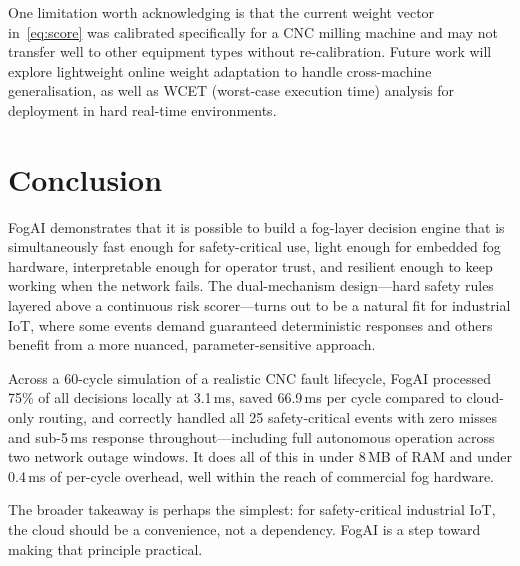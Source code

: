 \documentclass[conference]{IEEEtran}
\begin{document}
One limitation worth acknowledging is that the current weight vector
in~\eqref{eq:score} was calibrated specifically for a CNC milling
machine and may not transfer well to other equipment types without
re-calibration.
Future work will explore lightweight online weight adaptation to handle
cross-machine generalisation, as well as WCET (worst-case execution
time) analysis for deployment in hard real-time environments.


\section{Conclusion}

FogAI demonstrates that it is possible to build a fog-layer decision
engine that is simultaneously fast enough for safety-critical use,
light enough for embedded fog hardware, interpretable enough for
operator trust, and resilient enough to keep working when the network
fails.
The dual-mechanism design---hard safety rules layered above a
continuous risk scorer---turns out to be a natural fit for industrial
IoT, where some events demand guaranteed deterministic responses and
others benefit from a more nuanced, parameter-sensitive approach.

Across a 60-cycle simulation of a realistic CNC fault lifecycle,
FogAI processed 75\% of all decisions locally at 3.1\,ms, saved
66.9\,ms per cycle compared to cloud-only routing, and correctly
handled all 25 safety-critical events with zero misses and sub-5\,ms
response throughout---including full autonomous operation across two
network outage windows.
It does all of this in under 8\,MB of RAM and under 0.4\,ms of
per-cycle overhead, well within the reach of commercial fog hardware.

The broader takeaway is perhaps the simplest: for safety-critical
industrial IoT, the cloud should be a convenience, not a dependency.
FogAI is a step toward making that principle practical.




\end{document}
